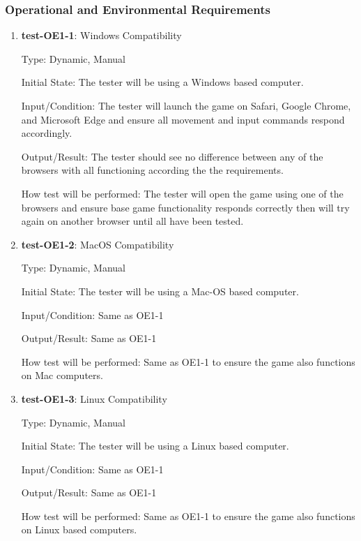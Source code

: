 \documentclass[12pt, titlepage]{article}
\begin{document}
\subsubsection{Operational and Environmental Requirements}

\begin{enumerate}

\item{\textbf{test-OE1-1}: Windows Compatibility\\}

Type: Dynamic, Manual
					
Initial State: The tester will be using a Windows based computer.
					
Input/Condition: The tester will launch the game on Safari, Google Chrome, and Microsoft Edge and ensure all movement and input commands respond accordingly.
					
Output/Result: The tester should see no difference between any of the browsers with all functioning according the the requirements. 
					
How test will be performed: The tester will open the game using one of the browsers and ensure base game functionality responds correctly then will try again on another browser until all have been tested.

\item{\textbf{test-OE1-2}: MacOS Compatibility\\}

Type: Dynamic, Manual
					
Initial State: The tester will be using a Mac-OS based computer.
					
Input/Condition: Same as OE1-1
					
Output/Result: Same as OE1-1
					
How test will be performed: Same as OE1-1 to ensure the game also functions on Mac computers.

\item{\textbf{test-OE1-3}: Linux Compatibility\\}

Type: Dynamic, Manual
					
Initial State: The tester will be using a Linux based computer.
					
Input/Condition: Same as OE1-1
					
Output/Result: Same as OE1-1
					
How test will be performed: Same as OE1-1 to ensure the game also functions on Linux based computers.

\end{enumerate}
\end{document}
